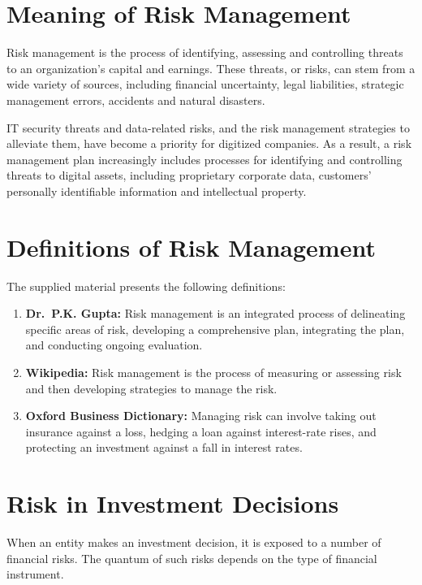 \documentclass[
]{book}
\providecommand{\tightlist}{%
  \setlength{\itemsep}{0pt}\setlength{\parskip}{0pt}}
\begin{document}
\section{Meaning of Risk Management}\label{meaning-of-risk-management}

Risk management is the process of identifying, assessing and controlling threats to an organization's capital and earnings. These threats, or risks, can stem from a wide variety of sources, including financial uncertainty, legal liabilities, strategic management errors, accidents and natural disasters.

IT security threats and data-related risks, and the risk management strategies to alleviate them, have become a priority for digitized companies. As a result, a risk management plan increasingly includes processes for identifying and controlling threats to digital assets, including proprietary corporate data, customers' personally identifiable information and intellectual property.

\section{Definitions of Risk Management}\label{definitions-of-risk-management}

The supplied material presents the following definitions:

\begin{enumerate}
\def\labelenumi{\arabic{enumi}.}
\tightlist
\item
  \textbf{Dr.~P.K. Gupta:} Risk management is an integrated process of delineating specific areas of risk, developing a comprehensive plan, integrating the plan, and conducting ongoing evaluation.
\item
  \textbf{Wikipedia:} Risk management is the process of measuring or assessing risk and then developing strategies to manage the risk.
\item
  \textbf{Oxford Business Dictionary:} Managing risk can involve taking out insurance against a loss, hedging a loan against interest-rate rises, and protecting an investment against a fall in interest rates.
\end{enumerate}

\section{Risk in Investment Decisions}\label{risk-in-investment-decisions}

When an entity makes an investment decision, it is exposed to a number of financial risks. The quantum of such risks depends on the type of financial instrument.
\end{document}
